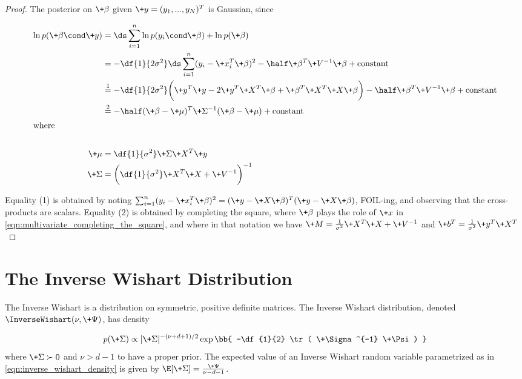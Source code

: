 \documentclass{article} %
\begin{document}
\begin{proof}
The posterior on $\+\beta$ given $\+y = (y_1,...,y_N)^T$ is Gaussian,  since

\begin{align*}
\ln p(\+\beta \cond \+y) &= \ds\sum_{i=1}^n \ln p(y_i \cond \+\beta)  + \ln p(\+\beta) \\
&= -\df{1}{2 \sigma^2} \ds\sum_{i=1}^n (y_i - \+x_i^T \+\beta)^2  - \half \+\beta^T \+V^{-1} \+\beta + \text{constant} \\
&\stackrel{1}{=} -\df{1}{2 \sigma^2} \bigg(  \+y^T \+y - 2 \+y^T \+X^T \+\beta + \+\beta^T \+X^T \+X \+\beta \bigg)  - \half \+\beta^T \+V^{-1} \+\beta + \text{constant} \\
&\stackrel{2}{=} -\half (\+\beta - \+\mu)^T \+\Sigma^{-1} (\+\beta - \+\mu) +  \text{constant} \\
\intertext{where}  \\
\+\mu &= \df{1}{\sigma^2} \+\Sigma \+X^T \+y \\
\+\Sigma &= \bigg( \df{1}{\sigma^2}  \+X^T \+X + \+V^{-1}  \bigg)^{-1} \\
\end{align*}

Equality (1) is obtained by noting $ \sum_{i=1}^n (y_i - \+x_i^T \+\beta)^2  = (\+y - \+X \+\beta)^T (\+y - \+X \+\beta)$, FOIL-ing, and observing that the cross-products are scalars.   Equality (2) is obtained by completing the square,  where $\+\beta$ plays the role of $\+x$  in \eqref{eqn:multivariate_completing_the_square},  and where in that notation we have $\+M = \frac{1}{\sigma^2} \+X^T \+X + \+V^{-1}$ and $\+b^T = \frac{1}{\sigma^2} \+y^T \+X^T$
\end{proof}

\section{The Inverse Wishart Distribution} \label{sec:inverse_wishart_distribution}
 
The Inverse Wishart is a distribution on symmetric,  positive definite matrices.     The Inverse Wishart distribution,  denoted $\InverseWishart(\nu, \+\Psi)$,  has density

\begin{align}
p(\+\Sigma) \propto | \+\Sigma|^{-(\nu+d +1) /2}  \exp \bb{ -\df{1}{2} \tr ( \+\Sigma^{-1} \+\Psi) } 
\label{eqn:inverse_wishart_density}
\end{align}
where $\+\Sigma \succ 0$ and $\nu > d-1$ to have a proper prior.     The expected value of an Inverse Wishart random variable parametrized as in \eqref{eqn:inverse_wishart_density} is given by $\E[\+\Sigma] = \frac{\+\Psi}{\nu -d -1}$.   
\end{document}
